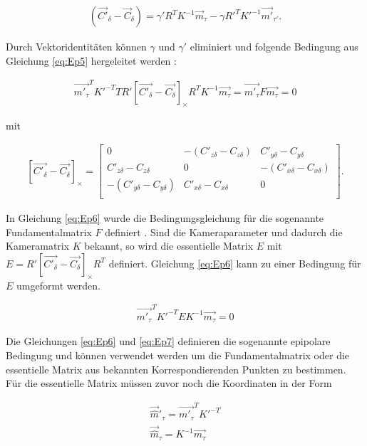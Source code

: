 \begin{gather}
	(\vec{C'}_\delta - \vec{C}_\delta) = \gamma' R^TK^{-1}\vec{m}_\tau - \gamma R'^TK'^{-1}\vec{m'}_{\tau'}. \label{eq:Ep5}
\end{gather}

Durch Vektoridentitäten können $\gamma$ und $\gamma'$ eliminiert und folgende Bedingung aus Gleichung \ref{eq:Ep5} hergeleitet werden \cite{Bronstein}: %

\begin{gather}
	\vec{m'_\tau}^TK'^{-T}TR' \left[ \vec{C'_\delta}-\vec{C_\delta}\right]_\times R^TK^{-1}\vec{m_\tau}=\vec{m'_\tau}F\vec{m_\tau} = 0\label{eq:Ep6}
\end{gather}

mit  

\begin{gather}
	\left[ \vec{C'_\delta}-\vec{C_\delta}\right]_\times=
	\begin{bmatrix}0&-(C'_{z\delta}-C_{z\delta})&C'_{y\delta}-C_{y\delta}\\
		C'_{z\delta}-C_{z\delta}&0&-(C'_{x\delta}-C_{x\delta})\\
		-(C'_{y\delta}-C_{y\delta})&C'_{x \delta}-C_{x\delta}&0\\
	\end{bmatrix}.
\end{gather}

In Gleichung \ref{eq:Ep6} wurde die Bedingungsgleichung für die sogenannte Fundamentalmatrix $F$ definiert \cite{Hoffmann}. Sind die Kameraparameter und dadurch die Kameramatrix $K$ bekannt, so wird die essentielle Matrix $E$  mit $E=R' \left[ \vec{C'_\delta}-\vec{C_\delta}\right]_\times R^T$ definiert. Gleichung \ref{eq:Ep6} kann zu einer Bedingung für $E$ umgeformt werden.

\begin{gather}
	\vec{m'_\tau}^TK'^{-T}EK^{-1}\vec{m_\tau} = 0\label{eq:Ep7}
\end{gather}

Die Gleichungen \ref{eq:Ep6} und \ref{eq:Ep7} definieren die sogenannte epipolare Bedingung\cite{HZ,Hoffmann} und können verwendet werden um die Fundamentalmatrix oder die essentielle Matrix aus bekannten Korrespondierenden Punkten zu bestimmen. Für die essentielle Matrix müssen zuvor noch die Koordinaten in der Form

\begin{gather}
	\vec{\hat{m}}'_\tau = \vec{m'_\tau}^TK'^{-T}\\
	\vec{\hat{m}}_\tau = K^{-1}\vec{m_\tau}\label{eq:equ8}
\end{gather}

